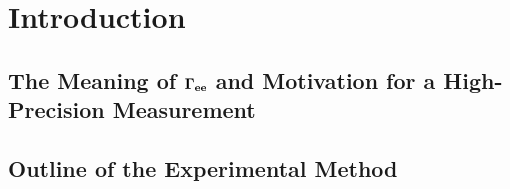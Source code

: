 \documentclass[aps,prd,preprint,superscriptaddress,tightenlines,nofootinbib,floatfix]{revtex4}
\begin{document}
%
\section{Introduction}
%

%
\subsection{The Meaning of $\bf \Gamma_{ee}$ and Motivation for a High-Precision Measurement}
%




%
\subsection{Outline of the Experimental Method}
%

\end{document}
